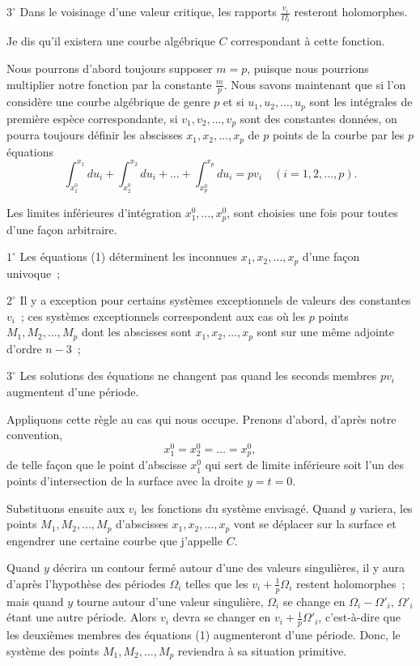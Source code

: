 \documentclass{article}
\begin{document}
$3^\circ$ Dans le voisinage d'une valeur critique, les rapports $\frac{v_{i}}{\Omega_{i}}$ resteront holomorphes.

Je dis qu'il existera une courbe algébrique $C$ correspondant à cette fonction.

Nous pourrons d'abord toujours supposer $m = p$, puisque nous pourrions multiplier notre fonction par la constante $\frac{m}{p}$. Nous savons maintenant que si l'on considère une courbe algébrique de genre $p$ et si $u_{1}, u_{2}, \ldots, u_{p}$ sont les intégrales de première espèce correspondante, si $v_{1}, v_{2}, \ldots, v_{p}$ sont des constantes données, on pourra toujours définir les abscisses $x_{1}, x_{2}, \ldots, x_{p}$ de $p$ points de la courbe par les $p$ équations
\[
\int_{x_{1}^{0}}^{x_{1}} du_{i} + \int_{x_{2}^{0}}^{x_{2}} du_{i} + \ldots + \int_{x_{p}^{0}}^{x_{p}} du_{i} = p v_{i} \quad (i = 1, 2, \ldots, p). \tag{1}
\]

Les limites inférieures d'intégration $x_{1}^{0}, \ldots, x_{p}^{0}$, sont choisies une fois pour toutes d'une façon arbitraire.

$1^\circ$ Les équations (1) déterminent les inconnues $x_{1}, x_{2}, \ldots, x_{p}$ d'une façon univoque~;

$2^\circ$ Il y a exception pour certains systèmes exceptionnels de valeurs des constantes $v_{i}$~; ces systèmes exceptionnels correspondent aux cas où les $p$ points $M_{1}, M_{2}, \ldots, M_{p}$ dont les abscisses sont $x_{1}, x_{2}, \ldots, x_{p}$ sont sur une même adjointe d'ordre $n - 3$~;

$3^\circ$ Les solutions des équations ne changent pas quand les seconds membres $p v_{i}$ augmentent d'une période.

Appliquons cette règle au cas qui nous occupe. Prenons d'abord, d'après notre convention,
\[
x_{1}^{0} = x_{2}^{0} = \ldots = x_{p}^{0},
\]
de telle façon que le point d'abscisse $x_{1}^{0}$ qui sert de limite inférieure soit l'un des points d'intersection de la surface avec la droite $y = t = 0$.

Substituons ensuite aux $v_{i}$ les fonctions du système envisagé. Quand $y$ variera, les points $M_{1}, M_{2}, \ldots, M_{p}$ d'abscisses $x_{1}, x_{2}, \ldots, x_{p}$ vont se déplacer sur la surface et engendrer une certaine courbe que j'appelle $C$.

Quand $y$ décrira un contour fermé autour d'une des valeurs singulières, il y aura d'après l'hypothèse des périodes $\Omega_{i}$ telles que les $v_{i} + \frac{1}{p} \Omega_{i}$ restent holomorphes~; mais quand $y$ tourne autour d'une valeur singulière, $\Omega_{i}$ se change en $\Omega_{i} - \Omega'_{i}$, $\Omega'_{i}$ étant une autre période. Alors $v_{i}$ devra se changer en $v_{i} + \frac{1}{p} \Omega'_{i}$, c'est-à-dire que les deuxièmes membres des équations (1) augmenteront d'une période. Donc, le système des points $M_{1}, M_{2}, \ldots, M_{p}$ reviendra à sa situation primitive.
\end{document}
